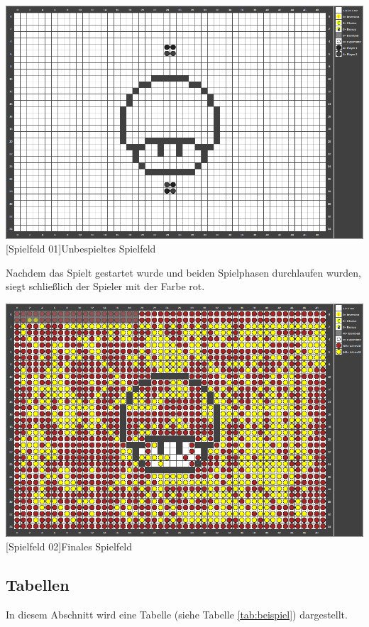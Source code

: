 \documentclass[12pt,a4paper,bibliography=totocnumbered,listof=totocnumbered]{scrartcl}
\begin{document}
    \vspace{1em}
    \begin{minipage}{\linewidth}
        \centering
        \includegraphics[width=0.6\linewidth]{pics/gamefield01.png}
        [Spielfeld 01]{Unbespieltes Spielfeld\footnotemark }
        \label{fig:reversi01}
    \end{minipage}

    Nachdem das Spielt gestartet wurde und beiden Spielphasen durchlaufen wurden, siegt schließlich der Spieler mit der Farbe rot.

    \vspace{1em}
    \begin{minipage}{\linewidth}
        \centering
        \includegraphics[width=0.6\linewidth]{pics/gamefield02.png}
        [Spielfeld 02]{Finales Spielfeld\footnotemark }
        \label{fig:reversi2}
    \end{minipage}

    \subsection{Tabellen}
    In diesem Abschnitt wird eine Tabelle (siehe Tabelle \ref{tab:beispiel}) dargestellt.
\end{document}
